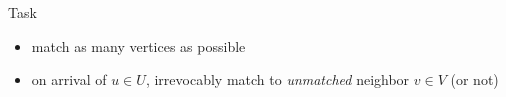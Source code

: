 \documentclass{beamer}
\begin{document}
\begin{frame}
\begin{columns}
\begin{column}{.3\textwidth}
{
      }%
    \end{column}
  \end{columns}
  \begin{alertblock}{Task}
    \begin{itemize}
      \item<8-> match as many vertices as possible
      \item<9-> on arrival of $u \in U$, \alert{irrevocably} match to \emph{unmatched}
        neighbor $v \in V$ (or not)
    \end{itemize}   
  \end{alertblock}
\end{frame}
\end{document}
